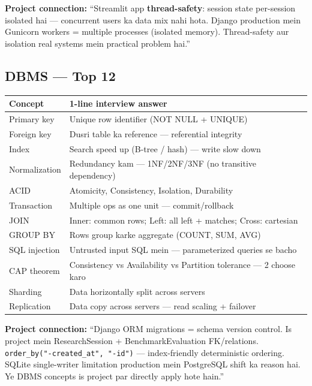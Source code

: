 \begin{interviewbox}
\textbf{Project connection:} ``Streamlit app \textbf{thread-safety}: session state per-session isolated hai --- concurrent users ka data mix nahi hota. Django production mein Gunicorn workers = multiple processes (isolated memory). Thread-safety aur isolation real systems mein practical problem hai.''
\end{interviewbox}

\subsection{DBMS --- Top 12}

\begin{longtable}{p{4.5cm} p{9.5cm}}
\toprule
\textbf{Concept} & \textbf{1-line interview answer} \\
\midrule
Primary key & Unique row identifier (NOT NULL + UNIQUE) \\
Foreign key & Dusri table ka reference --- referential integrity \\
Index & Search speed up (B-tree / hash) --- write slow down \\
Normalization & Redundancy kam --- 1NF/2NF/3NF (no transitive dependency) \\
ACID & Atomicity, Consistency, Isolation, Durability \\
Transaction & Multiple ops as one unit --- commit/rollback \\
JOIN & Inner: common rows; Left: all left + matches; Cross: cartesian \\
GROUP BY & Rows group karke aggregate (COUNT, SUM, AVG) \\
SQL injection & Untrusted input SQL mein --- parameterized queries se bacho \\
CAP theorem & Consistency vs Availability vs Partition tolerance --- 2 choose karo \\
Sharding & Data horizontally split across servers \\
Replication & Data copy across servers --- read scaling + failover \\
\bottomrule
\end{longtable}

\begin{interviewbox}
\textbf{Project connection:} ``Django ORM migrations = schema version control. Is project mein ResearchSession + BenchmarkEvaluation FK/relations. \texttt{order\_by("-created\_at", "-id")} --- index-friendly deterministic ordering. SQLite single-writer limitation production mein PostgreSQL shift ka reason hai. Ye DBMS concepts is project par directly apply hote hain.''
\end{interviewbox}

